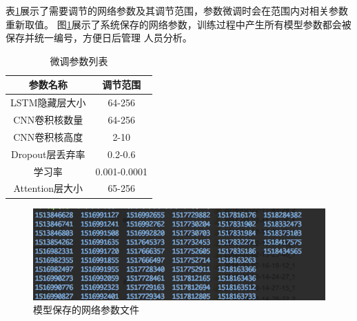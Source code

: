 \documentclass{standalone}
\begin{document}
表\ref{net_data_alert_table}展示了需要调节的网络参数及其调节范围，参数微调时会在范围内对相关参数重新取值。
图\ref{train_tmp_data}展示了系统保存的网络参数，训练过程中产生所有模型参数都会被保存并统一编号，方便日后管理
人员分析。
\begin{table}[h]
    \caption{微调参数列表}
    \begin{tabular}{|c|c|}
        \hline
        参数名称 & 调节范围 \\
        \hline
         LSTM隐藏层大小 & 64-256 \\
        \hline
        CNN卷积核数量 & 64-256 \\
        \hline
        CNN卷积核高度 & 2-10 \\
        \hline
        Dropout层丢弃率 & 0.2-0.6 \\
        \hline
        学习率 & 0.001-0.0001 \\
        \hline
        Attention层大小 & 65-256 \\
        \hline
    \end{tabular}
    \label{net_data_alert_table}
    \end{table}

\begin{figure}[!hbp]
    \includegraphics[scale=0.6]{picture/train_tmp_data.png}
    \caption{模型保存的网络参数文件}
    \label{train_tmp_data}
\end{figure}
\end{document}
